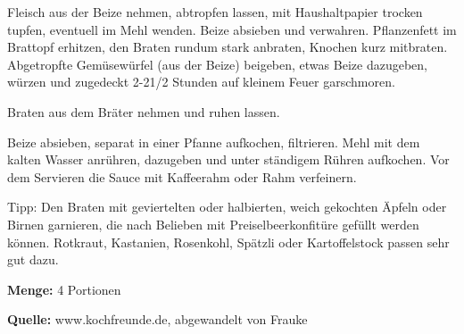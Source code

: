 {Fleisch aus der Beize nehmen, abtropfen lassen, mit Haushaltpapier trocken tupfen, eventuell im Mehl wenden.
Beize absieben und verwahren. Pflanzenfett im Brattopf erhitzen, den Braten rundum stark anbraten, Knochen kurz mitbraten. Abgetropfte Gemüsewürfel (aus der Beize) beigeben, etwas Beize dazugeben, würzen und zugedeckt 2-21/2 Stunden auf kleinem Feuer garschmoren.

Braten aus dem Bräter nehmen und ruhen lassen.

Beize absieben, separat in einer Pfanne aufkochen, filtrieren. Mehl mit dem kalten Wasser anrühren, dazugeben und unter ständigem Rühren aufkochen. Vor dem Servieren die Sauce mit Kaffeerahm oder Rahm verfeinern.

Tipp:  Den Braten mit geviertelten oder halbierten, weich gekochten Äpfeln oder Birnen garnieren, die nach Belieben mit Preiselbeerkonfitüre gefüllt werden können. Rotkraut, Kastanien, Rosenkohl, Spätzli oder Kartoffelstock passen sehr gut dazu.


{\bfseries Menge:} 4 Portionen

{\bfseries Quelle:} www.kochfreunde.de, abgewandelt von Frauke 

} 

